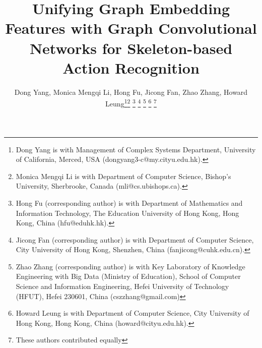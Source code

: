 \documentclass[journal]{IEEEtran}
\begin{document}
\title{Unifying Graph Embedding Features with Graph Convolutional Networks for Skeleton-based Action Recognition}
\author{Dong Yang,
        Monica Mengqi Li,
        Hong Fu,
        Jicong Fan,
        Zhao Zhang,
        Howard Leung\thanks{Dong Yang is with Management of Complex Systems Department, University of California, Merced, USA (dongyang3-c@my.cityu.edu.hk).}\thanks{Monica Mengqi Li is with Department of Computer Science, Bishop's University, Sherbrooke, Canada (mli@cs.ubishops.ca).}
\thanks{Hong Fu (corresponding author) is with Department of Mathematics and
Information Technology, The Education University of Hong Kong, Hong Kong,
China (hfu@eduhk.hk).}
\thanks{Jicong Fan (corresponding author) is with Department of Computer Science, City University of Hong Kong, Shenzhen, China (fanjicong@cuhk.edu.cn).}
\thanks{Zhao Zhang (corresponding author) is with Key Laboratory of Knowledge Engineering with Big Data (Ministry of Education), School of Computer Science and Information Engineering, Hefei University of Technology (HFUT), Hefei 230601, China (cszzhang@gmail.com)}
\thanks{Howard Leung is with Department of Computer Science, City University of Hong Kong, Hong Kong, China (howard@cityu.edu.hk).}
\thanks{ These authors contributed equally}

}



















\maketitle
\end{document}
